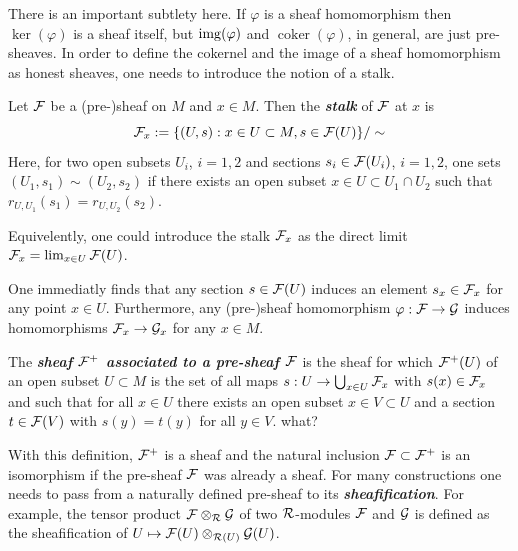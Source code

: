 There is an important subtlety here. If $\varphi$ is a sheaf homomorphism then $\ker(\varphi)$ is a sheaf itself, but $\operatorname{img}(\varphi)$ and $\operatorname{coker}(\varphi)$, in general, are just pre-sheaves. In order to define the cokernel and the image of a sheaf homomorphism as honest sheaves, one needs to introduce the notion of a stalk.
\begin{defn}
	Let $\mathcal{F}$ be a (pre-)sheaf on $M$ and $x\in M$. Then the \textbf{\textit{stalk}} of $\mathcal{F}$ at $x$ is
	\[\mathcal{F}_x:=\{(U,s):x\in U\subset M,s\in\mathcal{F}(U)\}/\sim\]
	Here, for two open subsets $U_i$, $i=1,2$ and sections $s_i\in\mathcal{F}(U_i)$, $i=1,2$, one sets $(U_1,s_1)\sim(U_2,s_2)$ if there exists an open subset $x\in U\subset U_1\cap U_2$ such that $r_{U,U_1}(s_1)=r_{U,U_2}(s_2)$.
	
	Equivelently, one could introduce the stalk $\mathcal{F}_x$ as the direct limit $\mathcal{F}_x=\lim_{x\in U}\mathcal{F}(U)$.
\end{defn}
\begin{remark}
	One immediatly finds that any section $s\in\mathcal{F}(U)$ induces an element $s_x\in\mathcal{F}_x$ for any point $x\in U$. Furthermore, any (pre-)sheaf homomorphism $\varphi:\mathcal{F}\to\mathcal{G}$ induces homomorphisms $\mathcal{F}_x\to\mathcal{G}_x$ for any $x\in M$.
\end{remark}
\begin{defn}
	The \textbf{\textit{sheaf $\mathcal{F}^+$ associated to a pre-sheaf $\mathcal{F}$}} is the sheaf for which $\mathcal{F}^+(U)$ of an open subset $U\subset M$ is the set of all maps $s:U\to\bigcup_{x\in U}\mathcal{F}_x$ with $s(x)\in\mathcal{F}_x$ and such that for all $x\in U$ there exists an open subset $x\in V\subset U$ and a section $t\in\mathcal{F}(V)$ with $s(y)=t(y)$ for all $y\in V$. {\color{magenta}what?}
\end{defn}
\begin{remark}
	With this definition, $\mathcal{F}^+$ is a sheaf and the natural inclusion $\mathcal{F}\subset\mathcal{F}^+$ is an isomorphism if the pre-sheaf $\mathcal{F}$ was already a sheaf. For many constructions one needs to pass from a naturally defined pre-sheaf to its \textbf{\textit{sheafification}}. For example, the tensor product $\mathcal{F}\otimes_{\mathcal{R}}\mathcal{G}$ of two $\mathcal{R}$-modules $\mathcal{F}$ and $\mathcal{G}$ is defined as the sheafification of $U\mapsto\mathcal{F}(U)\otimes_{\mathcal{R}(U)}\mathcal{G}(U)$.
\end{remark}

